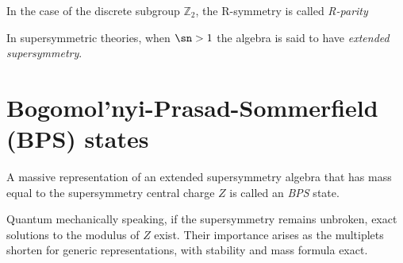 \begin{remark}
In the case of the discrete subgroup $\mathbb{Z}_2$, the R-symmetry is called \textit{R-parity}
\end{remark}

\begin{definition}
In supersymmetric theories, when $\sn>1$ the algebra is said to have
\textit{extended supersymmetry}.
\end{definition}

\section{Bogomol'nyi-Prasad-Sommerfield (BPS) states}
\begin{definition}
A massive representation of an extended supersymmetry algebra that has mass
equal to the supersymmetry central charge $Z$ is called an \textit{BPS} state.
\end{definition}

Quantum mechanically speaking, if the supersymmetry remains unbroken, exact
solutions to the modulus of $Z$ exist. Their importance arises as the
multiplets shorten for generic representations, with stability and mass formula
exact.

